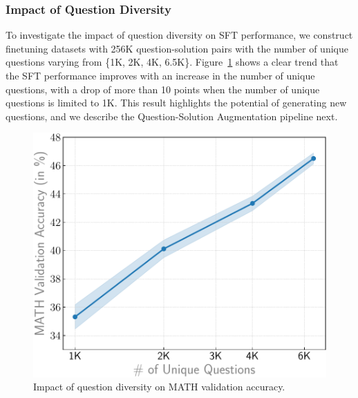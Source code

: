 \subsubsection{Impact of Question Diversity}


To investigate the impact of question diversity on SFT performance, we construct finetuning datasets with 256K question-solution pairs with the number of unique questions varying from \{1K, 2K, 4K, 6.5K\}. Figure~\ref{fig:question_diversity} shows a clear trend that the SFT performance improves with an increase in the number of unique questions, with a drop of more than 10 points when the number of unique questions is limited to 1K. 
This result highlights the potential of generating new questions, and we describe the Question-Solution Augmentation pipeline next. 


\begin{figure}
    \centering
    \includegraphics[width=0.85\linewidth]{plots/question_diversity.pdf}
    \caption{Impact of question diversity on MATH validation accuracy.} 
    \label{fig:question_diversity}
    \vspace{-0.2in}
\end{figure}
